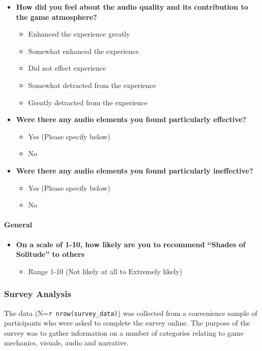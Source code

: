 \documentclass[
  letterpaper,
  DIV=11,
  numbers=noendperiod]{scrartcl}
\let\oldparagraph\paragraph
\renewcommand{\paragraph}[1]{\oldparagraph{#1}\mbox{}}
\providecommand{\tightlist}{%
  \setlength{\itemsep}{0pt}\setlength{\parskip}{0pt}}\usepackage{longtable,booktabs,array}
\begin{document}
\begin{itemize}
\item
  \textbf{How did you feel about the audio quality and its contribution
  to the game atmosphere?}

  \begin{itemize}
  \tightlist
  \item
    Enhanced the experience greatly
  \item
    Somewhat enhanced the experience
  \item
    Did not effect experience
  \item
    Somewhat detracted from the experience
  \item
    Greatly detracted from the experience
  \end{itemize}
\item
  \textbf{Were there any audio elements you found particularly
  effective?}

  \begin{itemize}
  \tightlist
  \item
    Yes (Please specify below)
  \item
    No
  \end{itemize}
\item
  \textbf{Were there any audio elements you found particularly
  ineffective?}

  \begin{itemize}
  \tightlist
  \item
    Yes (Please specify below)
  \item
    No
  \end{itemize}
\end{itemize}

\paragraph{General}\label{general}

\begin{itemize}
\item
  \textbf{On a scale of 1-10, how likely are you to recommend ``Shades
  of Solitude'' to others}

  \begin{itemize}
  \tightlist
  \item
    Range 1-10 (Not likely at all to Extremely likely)
  \end{itemize}
\end{itemize}

\subsubsection{Survey Analysis}\label{survey-analysis}

The data (N=\texttt{r\ nrow(survey\_data)}) was collected from a
convenience sample of participants who were asked to complete the survey
online. The purpose of the survey was to gather information on a number
of categories relating to game mechanics, visuals, audio and narrative.
\end{document}
